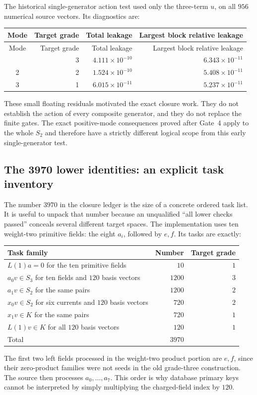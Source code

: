 The historical single-generator action test used only the three-term
$u$, on all $956$ numerical source vectors. Its diagnostics are:

\begin{longtable}{@{}crrr@{}}
\toprule Mode&Target grade&Total leakage&Largest block relative leakage\\\midrule\endfirsthead
\toprule Mode&Target grade&Total leakage&Largest block relative leakage\\\midrule\endhead
\bottomrule\endfoot
1 & 3 & $4.111\times10^{-10}$ & $6.343\times10^{-11}$\\
2 & 2 & $1.524\times10^{-10}$ & $5.408\times10^{-11}$\\
3 & 1 & $6.015\times10^{-11}$ & $5.237\times10^{-11}$\\
\end{longtable}
These small floating residuals motivated the exact closure work.
They do not establish the action of every composite generator, and they
do not replace the finite gates. The exact positive-mode consequences
proved after Gate~4 apply to the whole $S_2$ and therefore have a
strictly different logical scope from this early single-generator test.


\subsection{The 3970 lower identities: an explicit task inventory}
\label{expfinite:3970}

The number $3970$ in the closure ledger is the size of a concrete
ordered task list. It is useful to unpack that number because an
unqualified ``all lower checks passed'' conceals several different
target spaces. The implementation
 uses ten
weight-two primitive fields: the eight $a_i$, followed by $e,f$.
Its tasks are exactly:
\begin{center}\small
\begin{tabular}{@{}lrr@{}}
\toprule
Task family&Number&Target grade\\\midrule
$L(1)a=0$ for the ten primitive fields&$10$&$1$\\
$a_0v\in S_3$ for ten fields and $120$ basis vectors&$1200$&$3$\\
$a_1v\in S_2$ for the same pairs&$1200$&$2$\\
$x_0v\in S_2$ for six currents and $120$ basis vectors&$720$&$2$\\
$x_1v\in K$ for the same pairs&$720$&$1$\\
$L(1)v\in K$ for all $120$ basis vectors&$120$&$1$\\
\midrule Total&$3970$&\\\bottomrule
\end{tabular}
\end{center}
The first two left fields processed in the weight-two product portion
are $e,f$, since their zero-product families were not seeds in the old
grade-three construction. The source then processes $a_0,\ldots,a_7$.
This order is why database primary keys cannot be interpreted by simply
multiplying the charged-field index by $120$.

